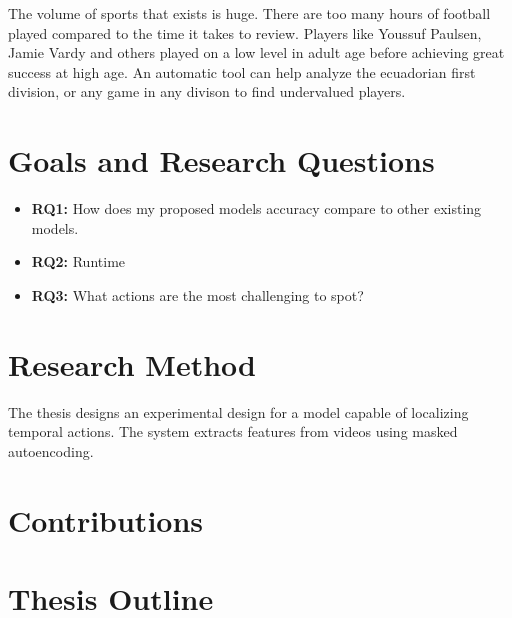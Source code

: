 The volume of sports that exists is huge. There are too many hours of football played compared to the time it takes to review. Players like Youssuf Paulsen, Jamie Vardy and others played on a low level in adult age before achieving great success at high age. An automatic tool can help analyze the ecuadorian first division, or any game in any divison to find undervalued players. 

\section{Goals and Research Questions}

\begin{itemize}
    \item \textbf{RQ1:} How does my proposed models accuracy compare to other existing models.
    \item \textbf{RQ2:} Runtime
    \item \textbf{RQ3:} What actions are the most challenging to spot?
\end{itemize}

\section{Research Method}

The thesis designs an experimental design for a model capable of localizing temporal actions. The system extracts features from videos using masked autoencoding.

\section{Contributions}

\section{Thesis Outline}


